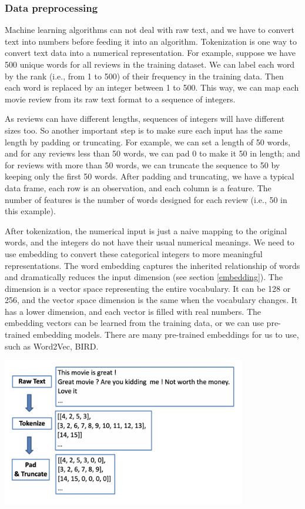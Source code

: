 \documentclass[
  12pt,
]{krantz}
\begin{document}
\hypertarget{data-preprocessing-2}{%
\subsubsection{Data preprocessing}\label{data-preprocessing-2}}

Machine learning algorithms can not deal with raw text, and we have to convert text into numbers before feeding it into an algorithm. Tokenization is one way to convert text data into a numerical representation. For example, suppose we have 500 unique words for all reviews in the training dataset. We can label each word by the rank (i.e., from 1 to 500) of their frequency in the training data. Then each word is replaced by an integer between 1 to 500. This way, we can map each movie review from its raw text format to a sequence of integers.

As reviews can have different lengths, sequences of integers will have different sizes too. So another important step is to make sure each input has the same length by padding or truncating. For example, we can set a length of 50 words, and for any reviews less than 50 words, we can pad 0 to make it 50 in length; and for reviews with more than 50 words, we can truncate the sequence to 50 by keeping only the first 50 words. After padding and truncating, we have a typical data frame, each row is an observation, and each column is a feature. The number of features is the number of words designed for each review (i.e., 50 in this example).

After tokenization, the numerical input is just a naive mapping to the original words, and the integers do not have their usual numerical meanings. We need to use embedding to convert these categorical integers to more meaningful representations. The word embedding captures the inherited relationship of words and dramatically reduces the input dimension (see section \ref{embedding}). The dimension is a vector space representing the entire vocabulary. It can be 128 or 256, and the vector space dimension is the same when the vocabulary changes. It has a lower dimension, and each vector is filled with real numbers. The embedding vectors can be learned from the training data, or we can use pre-trained embedding models. There are many pre-trained embeddings for us to use, such as Word2Vec, BIRD.

\includegraphics[width=0.8\textwidth,height=\textheight]{images/TokenizingPadding.png}
\end{document}
